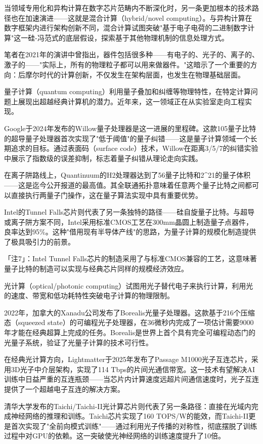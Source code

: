 \documentclass[11pt,a4paper]{article}
\begin{document}
当领域专用化和异构计算在数字芯片范畴内不断深化时，另一条更加根本的技术路径也在加速演进——这就是混合计算（hybrid/novel computing）。与异构计算在数字框架内进行架构创新不同，混合计算试图突破"基于电子电荷的二进制数字计算"这一硅-冯范式的底层假设，探索基于其他物理机制的信息处理方式。

笔者在2021年的演讲中曾指出，器件包括很多种——有电子的、光子的、离子的、激子的——"实际上，所有的物理粒子都可以用来做器件。"这暗示了一个重要的方向：后摩尔时代的计算创新，不仅发生在架构层面，也发生在物理基础层面。

量子计算（quantum computing）利用量子叠加和纠缠等物理特性，在特定计算问题上展现出超越经典计算机的潜力。近年来，这一领域正在从实验室走向工程实现。

Google于2024年发布的Willow量子处理器是这一进展的里程碑。这款105量子比特的超导量子处理器首次实现了"低于阈值"的量子纠错——这是量子计算领域一个长期追求的目标。通过表面码（surface code）技术，Willow在距离3/5/7的纠错实验中展示了指数级的误差抑制，标志着量子纠错从理论走向实践。

在离子阱路线上，Quantinuum的H2处理器达到了56量子比特和2^21的量子体积——这是迄今公开报道的最高值。其全联通拓扑意味着任意两个量子比特之间都可以直接执行两量子门操作，这在量子算法实现中具有重要优势。

Intel的Tunnel Falls芯片则代表了另一条独特的路径——硅自旋量子比特。与超导或离子阱方案不同，Intel采用标准CMOS工艺在300mm晶圆上制造量子点器件，良率达到95\%。这种"借用现有半导体产线"的思路，为量子计算的规模化制造提供了极具吸引力的前景。

「注7」：Intel Tunnel Falls芯片的制造采用了与标准CMOS兼容的工艺，这意味著量子比特的制造可以实现与经典芯片同样的规模经济效应。

光计算（optical/photonic computing）试图用光子替代电子来执行计算，利用光的速度、带宽和低功耗特性突破电子计算的物理限制。

2022年，加拿大的Xanadu公司发布了Borealis光量子处理器。这款基于216个压缩态（squeezed state）的可编程光子处理器，在36微秒内完成了一项估计需要9000年才能在经典超算上完成的任务。Borealis是世界上首个具有完全可编程动态门的光量子系统，验证了光量子计算的技术可行性。

在经典光计算方向，Lightmatter于2025年发布了Passage M1000光子互连芯片，采用3D光子中介层架构，实现了114 Tbps的片间光通信带宽。这一技术有望解决AI训练中日益严重的互连瓶颈——当芯片内计算速度远超片间通信速度时，光子互连提供了一个超越电子互连的解决方案。

清华大学发布的Taichi/Taichi-II光计算芯片则代表了另一条路径：直接在光域内完成神经网络的推理和训练。Taichi芯片实现了160 TOPS/W的能效，而Taichi-II更是首次实现了"全前向模式训练"——通过利用光子传播的对称性，彻底摆脱了训练过程中对GPU的依赖。这一突破使光神经网络的训练速度提升了10倍。
\end{document}
